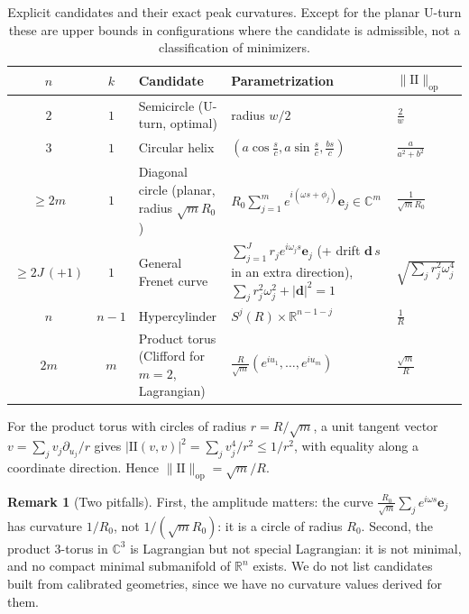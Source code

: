 \documentclass[11pt,reqno]{amsart}
\theoremstyle{definition}
\newtheorem{remark}[theorem]{Remark}
\providecommand{\R}{\mathbb{R}}
\newcommand{\C}{\mathbb{C}}
\providecommand{\II}{\mathrm{I\!I}}
\newcommand{\op}{\mathrm{op}}
\numberwithin{equation}{section}
\providecommand{\II}{\mathrm{II}}
\providecommand{\R}{\mathbb{R}}
\begin{document}
\begin{table}[htbp]
\centering
\small
\renewcommand{\arraystretch}{1.15}
\begin{tabularx}{\textwidth}{@{}cc>{\raggedright\arraybackslash}p{3.1cm}>{\raggedright\arraybackslash}X>{\centering\arraybackslash}p{2.0cm}@{}}
\toprule
$n$ & $k$ & Candidate & Parametrization & $\|\II\|_{\op}$ \\
\midrule
$2$ & $1$ & Semicircle (U-turn, optimal) & radius $w/2$ & $\frac{2}{w}$ \\
$3$ & $1$ & Circular helix & $(a\cos\frac{s}{c}, a\sin\frac{s}{c}, \frac{bs}{c})$ & $\frac{a}{a^2+b^2}$ \\
$\ge 2m$ & $1$ & Diagonal circle (planar, radius $\sqrt m R_0$) & $R_0\sum_{j=1}^m e^{i(\omega s + \phi_j)}\mathbf{e}_j \in \C^m$ & $\frac{1}{\sqrt m R_0}$ \\
$\ge 2J\,(+1)$ & $1$ & General Frenet curve & $\sum_{j=1}^J r_j e^{i\omega_j s}\mathbf{e}_j$ (+ drift $\mathbf{d}\,s$ in an extra direction), $\sum_j r_j^2\omega_j^2 + |\mathbf{d}|^2 = 1$ & $\sqrt{\sum_j r_j^2\omega_j^4}$ \\
$n$ & $n-1$ & Hypercylinder & $S^{j}(R) \times \R^{n-1-j}$ & $\frac{1}{R}$ \\
$2m$ & $m$ & Product torus (Clifford for $m=2$, Lagrangian) & $\frac{R}{\sqrt m}(e^{iu_1}, \dots, e^{iu_m})$ & $\frac{\sqrt m}{R}$ \\
\bottomrule
\end{tabularx}
\caption{Explicit candidates and their exact peak curvatures. Except for the planar U-turn these are upper bounds in configurations where the candidate is admissible, not a classification of minimizers.}
\label{tab:universal_classification}
\end{table}

For the product torus with circles of radius $r = R/\sqrt m$, a unit tangent vector $v = \sum_j v_j \partial_{u_j}/r$ gives $|\II(v,v)|^2 = \sum_j v_j^4/r^2 \le 1/r^2$, with equality along a coordinate direction. Hence $\|\II\|_{\op} = \sqrt m/R$.

\begin{remark}[Two pitfalls]
First, the amplitude matters: the curve $\frac{R_0}{\sqrt m}\sum_j e^{i\omega s}\mathbf{e}_j$ has curvature $1/R_0$, not $1/(\sqrt m R_0)$: it is a circle of radius $R_0$. Second, the product $3$-torus in $\C^3$ is Lagrangian but not special Lagrangian: it is not minimal, and no compact minimal submanifold of $\R^n$ exists. We do not list candidates built from calibrated geometries, since we have no curvature values derived for them.
\end{remark}
\end{document}
